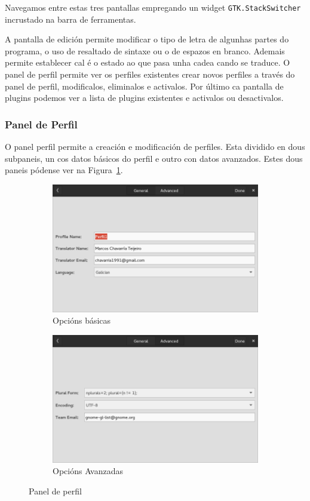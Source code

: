 Navegamos entre estas tres pantallas empregando un widget \lstinline{GTK.StackSwitcher} incrustado na barra de ferramentas.

A pantalla de edición permite modificar o tipo de letra de algunhas partes do programa, o uso de resaltado de sintaxe ou o de espazos en branco. Ademais permite establecer cal é o estado ao que pasa unha cadea cando se traduce. O panel de perfil permite ver os perfiles existentes crear novos perfiles a través do panel de perfil, modificalos, eliminalos e activalos. Por último ca pantalla de plugins podemos ver a lista de plugins existentes e activalos ou desactivalos.


\subsubsection{Panel de Perfil}
O panel perfil permite a creación e modificación de perfiles. Esta dividido en dous subpaneis, un cos datos básicos do perfil e outro con datos avanzados. Estes dous paneis pódense ver na Figura~\ref{fig:ui:panel:profile}.
\begin{figure}[h!]
  \centering
  \begin{subfigure}[b]{0.5\textwidth}
    \includegraphics[width=\textwidth]{img/panel_pefil_xeral.png}
    \caption{Opcións básicas}
  \end{subfigure}
  \begin{subfigure}[b]{0.5\textwidth}
    \includegraphics[width=\textwidth]{img/panel_perfil_avanzado.png}
    \caption{Opcións Avanzadas}
  \end{subfigure}
    \caption{Panel de perfil}
    \label{fig:ui:panel:profile}
\end{figure}

